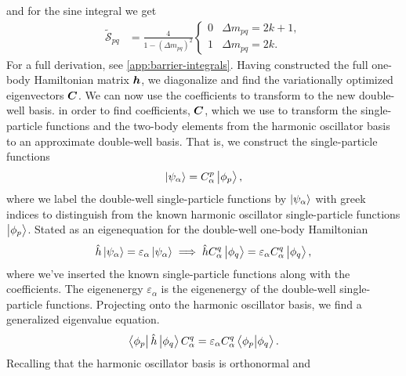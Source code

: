         and for the sine integral we get
        \begin{align}
            \tilde{\mathcal{S}}_{pq}
            &=
            \frac{4}{1 - (\Delta m_{pq})^2}
            \begin{cases}
                0 & \Delta m_{pq} = 2k + 1, \\
                1 & \Delta m_{pq} = 2k.
            \end{cases}
        \end{align}
        For a full derivation, see \autoref{app:barrier-integrals}.
        Having constructed the full one-body Hamiltonian matrix $\boldsymbol{h}$, we
        diagonalize and find the variationally optimized eigenvectors $\boldsymbol{C}$.
        We can now use the coefficients to transform to the new double-well
        basis.
        in order to find coefficients, $\boldsymbol{C}$, which we use to transform the
        single-particle functions and the two-body elements from the harmonic
        oscillator basis to an approximate double-well basis.
        That is, we construct the single-particle functions
        \begin{align}
            \ket{\psi_{\alpha}} = C^{p}_{\alpha}\ket{\phi_p},
        \end{align}
        where we label the double-well single-particle functions by
        $\ket{\psi_{\alpha}}$ with greek indices to distinguish from the known
        harmonic oscillator single-particle functions $\ket{\phi_p}$.
        Stated as an eigenequation for the double-well one-body Hamiltonian
        \begin{gather}
            \hat{h} \ket{\psi_{\alpha}}
            = \varepsilon_{\alpha} \ket{\psi_{\alpha}}
            \implies
            \hat{h} C^{q}_{\alpha} \ket{\phi_q}
            = \varepsilon_{\alpha} C^{q}_{\alpha} \ket{\phi_q},
        \end{gather}
        where we've inserted the known single-particle functions along with the
        coefficients.
        The eigenenergy $\varepsilon_{\alpha}$ is the eigenenergy of the
        double-well single-particle functions.
        Projecting onto the harmonic oscillator basis, we find a generalized
        eigenvalue equation.
        \begin{gather}
            \bra{\phi_{p}}\hat{h}\ket{\phi_q} C^{q}_{\alpha}
            = \varepsilon_{\alpha} C^{q}_{\alpha} \braket{\phi_{p}}{\phi_{q}}.
        \end{gather}
        Recalling that the harmonic oscillator basis is orthonormal and
